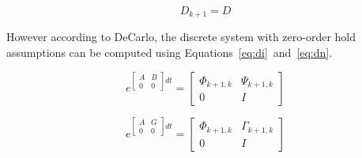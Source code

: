 \begin{equation}
    {D_{k + 1}} = D
\end{equation}

However according to DeCarlo\cite{DeCarlo}, the discrete system with zero-order hold assumptions can be computed using Equations~\ref{eq:di}~and~\ref{eq:dn}. 

\begin{equation}
    {e^{\left[ {\begin{array}{*{20}{c}}
    A&B\\
    0&0
    \end{array}} \right]dt}} = \left[ {\begin{array}{*{20}{c}}
    {{\Phi _{k + 1,k}}}&{{\Psi _{k + 1,k}}}\\
    0&I
    \end{array}} \right]
    \label{eq:di}
\end{equation}

\begin{equation}{e^{\left[ {\begin{array}{*{20}{c}}
    A&G\\
    0&0
    \end{array}} \right]dt}} = \left[ {\begin{array}{*{20}{c}}
    {{\Phi _{k + 1,k}}}&{{\Gamma _{k + 1,k}}}\\
    0&I
    \end{array}} \right]
    \label{eq:dn}
\end{equation}

